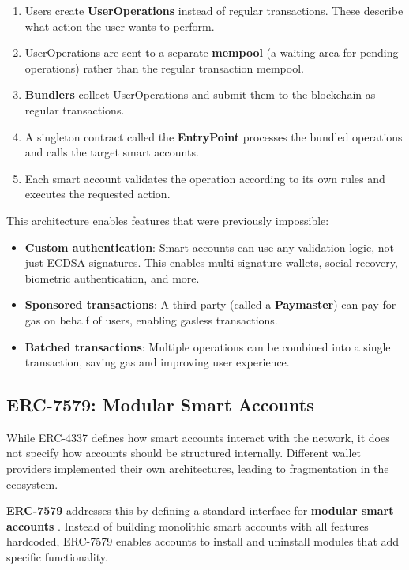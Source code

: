 \begin{enumerate}
    \item Users create \textbf{UserOperations} instead of regular transactions. These describe what action the user wants to perform.
    \item UserOperations are sent to a separate \textbf{mempool} (a waiting area for pending operations) rather than the regular transaction mempool.
    \item \textbf{Bundlers} collect UserOperations and submit them to the blockchain as regular transactions.
    \item A singleton contract called the \textbf{EntryPoint} processes the bundled operations and calls the target smart accounts.
    \item Each smart account validates the operation according to its own rules and executes the requested action.
\end{enumerate}

This architecture enables features that were previously impossible:

\begin{itemize}
    \item \textbf{Custom authentication}: Smart accounts can use any validation logic, not just ECDSA signatures. This enables multi-signature wallets, social recovery, biometric authentication, and more.
    \item \textbf{Sponsored transactions}: A third party (called a \textbf{Paymaster}) can pay for gas on behalf of users, enabling gasless transactions.
    \item \textbf{Batched transactions}: Multiple operations can be combined into a single transaction, saving gas and improving user experience.
\end{itemize}

\subsection{ERC-7579: Modular Smart Accounts}

While ERC-4337 defines how smart accounts interact with the network, it does not specify how accounts should be structured internally. Different wallet providers implemented their own architectures, leading to fragmentation in the ecosystem.

\textbf{ERC-7579} addresses this by defining a standard interface for \textbf{modular smart accounts} \cite{erc7579}. Instead of building monolithic smart accounts with all features hardcoded, ERC-7579 enables accounts to install and uninstall modules that add specific functionality.

